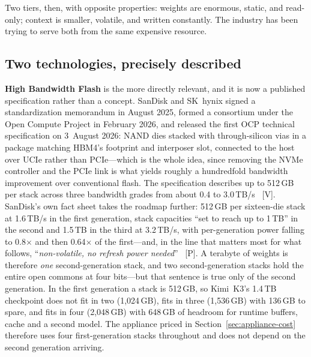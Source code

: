 Two tiers, then, with opposite properties: weights are enormous, static, and read-only; context is smaller, volatile, and written constantly. The industry has been trying to serve both from the same expensive resource.

\subsection{Two technologies, precisely described}

\textbf{High Bandwidth Flash} is the more directly relevant, and it is now a published specification rather than a concept. SanDisk and SK~hynix signed a standardization memorandum in August 2025, formed a consortium under the Open Compute Project in February 2026, and released the first OCP technical specification on 3~August 2026: NAND dies stacked with through-silicon vias in a package matching HBM4's footprint and interposer slot, connected to the host over UCIe rather than PCIe---which is the whole idea, since removing the NVMe controller and the PCIe link is what yields roughly a hundredfold bandwidth improvement over conventional flash. The specification describes up to 512\,GB per stack across three bandwidth grades from about 0.4 to 3.0\,TB/s~\cite{hbf-ocp,hbf-spec} [V]. SanDisk's own fact sheet takes the roadmap further: 512\,GB per sixteen-die stack at 1.6\,TB/s in the first generation, stack capacities ``set to reach up to 1\,TB'' in the second and 1.5\,TB in the third at 3.2\,TB/s, with per-generation power falling to 0.8$\times$ and then 0.64$\times$ of the first---and, in the line that matters most for what follows, ``\emph{non-volatile, no refresh power needed}''~\cite{sandisk-hbf-facts} [P]. A terabyte of weights is therefore \emph{one} second-generation stack, and two second-generation stacks hold the entire open commons at four bits---but that sentence is true only of the second generation. In the first generation a stack is 512\,GB, so Kimi~K3's 1.4\,TB checkpoint does not fit in two (1,024\,GB), fits in three (1,536\,GB) with 136\,GB to spare, and fits in four (2,048\,GB) with 648\,GB of headroom for runtime buffers, cache and a second model. The appliance priced in Section~\ref{sec:appliance-cost} therefore uses four first-generation stacks throughout and does not depend on the second generation arriving.

